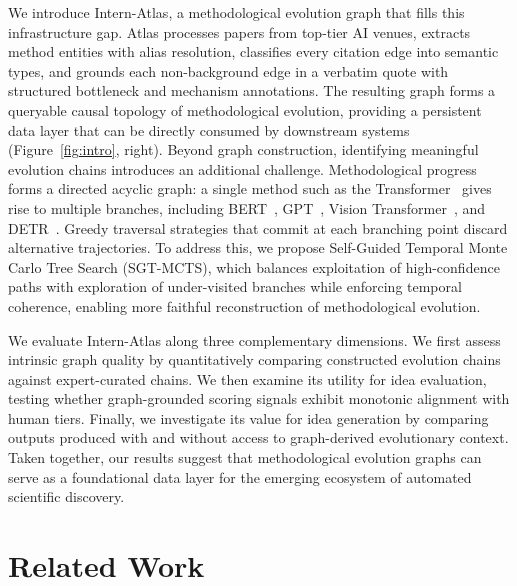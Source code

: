 \documentclass{opendatalab}
\begin{document}
We introduce Intern-Atlas, a methodological evolution graph that fills this infrastructure gap. Atlas processes papers from top-tier AI venues, extracts method entities with alias resolution, classifies every citation edge into semantic types, and grounds each non-background edge in a verbatim quote with structured bottleneck and mechanism annotations. The resulting graph forms a queryable causal topology of methodological evolution, providing a persistent data layer that can be directly consumed by downstream systems (Figure~\ref{fig:intro}, right). Beyond graph construction, identifying meaningful evolution chains introduces an additional challenge. Methodological progress forms a directed acyclic graph: a single method such as the Transformer~\cite{vaswani2017attention} gives rise to multiple branches, including BERT~\cite{devlin2019bert}, GPT~\cite{radford2018improving,radford2019language,brown2020language}, Vision Transformer~\cite{dosovitskiy2020image,khan2022transformers,han2022survey}, and DETR~\cite{carion2020end}. Greedy traversal strategies that commit at each branching point discard alternative trajectories. To address this, we propose Self-Guided Temporal Monte Carlo Tree Search (SGT-MCTS), which balances exploitation of high-confidence paths with exploration of under-visited branches while enforcing temporal coherence, enabling more faithful reconstruction of methodological evolution.

We evaluate Intern-Atlas along three complementary dimensions. We first assess intrinsic graph quality by quantitatively comparing constructed evolution chains against expert-curated chains. We then examine its utility for idea evaluation, testing whether graph-grounded scoring signals exhibit monotonic alignment with human tiers. Finally, we investigate its value for idea generation by comparing outputs produced with and without access to graph-derived evolutionary context. Taken together, our results suggest that methodological evolution graphs can serve as a foundational data layer for the emerging ecosystem of automated scientific discovery.

\section{Related Work}
\end{document}
